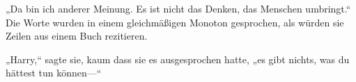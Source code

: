 „Da bin ich anderer Meinung. Es ist nicht das Denken, das Menschen umbringt.“ Die Worte wurden in einem gleichmäßigen Monoton gesprochen, als würden sie Zeilen aus einem Buch rezitieren.

„Harry,“ sagte sie, kaum dass sie es ausgesprochen hatte, „es gibt nichts, was du hättest tun können—“


